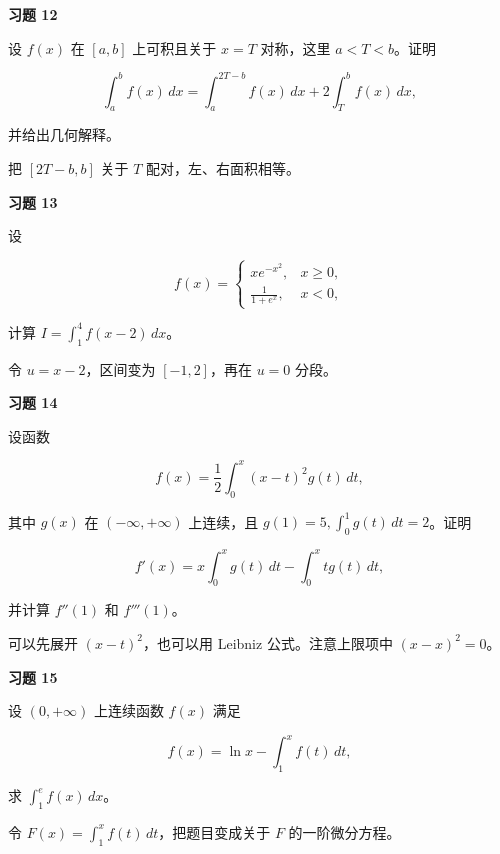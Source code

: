 \begin{exercisebox}
\textbf{习题 12 }

设 \(f(x)\) 在 \([a,b]\) 上可积且关于 \(x=T\) 对称，这里 \(a<T<b\)。证明

\[
        \int_a^b f(x)\,dx=\int_a^{2T-b} f(x)\,dx+2\int_T^b f(x)\,dx,
      \]

并给出几何解释。

\begin{hintbox}
把 \([2T-b,b]\) 关于 \(T\) 配对，左、右面积相等。
\end{hintbox}
\end{exercisebox}

\begin{exercisebox}
\textbf{习题 13 }

设

\[
      f(x)=
      \begin{cases}
      xe^{-x^2},&x\ge0,\\
      \frac1{1+e^x},&x<0,
      \end{cases}
      \]

计算 \(I=\int_1^4 f(x-2)\,dx\)。

\begin{hintbox}
令 \(u=x-2\)，区间变为 \([-1,2]\)，再在 \(u=0\) 分段。
\end{hintbox}
\end{exercisebox}

\begin{exercisebox}
\textbf{习题 14 }

设函数

\[
      f(x)=\frac12\int_0^x (x-t)^2g(t)\,dt,
      \]

其中 \(g(x)\) 在 \((-\infty,+\infty)\) 上连续，且 \(g(1)=5,\int_0^1g(t)\,dt=2\)。证明

\[
      f'(x)=x\int_0^xg(t)\,dt-\int_0^x tg(t)\,dt,
      \]

并计算 \(f''(1)\) 和 \(f'''(1)\)。

\begin{hintbox}
可以先展开 \((x-t)^2\)，也可以用 Leibniz 公式。注意上限项中 \((x-x)^2=0\)。
\end{hintbox}
\end{exercisebox}

\begin{exercisebox}
\textbf{习题 15 }

设 \((0,+\infty)\) 上连续函数 \(f(x)\) 满足

\[
      f(x)=\ln x-\int_1^x f(t)\,dt,
      \]

求 \(\int_1^e f(x)\,dx\)。

\begin{hintbox}
令 \(F(x)=\int_1^x f(t)\,dt\)，把题目变成关于 \(F\) 的一阶微分方程。
\end{hintbox}
\end{exercisebox}

